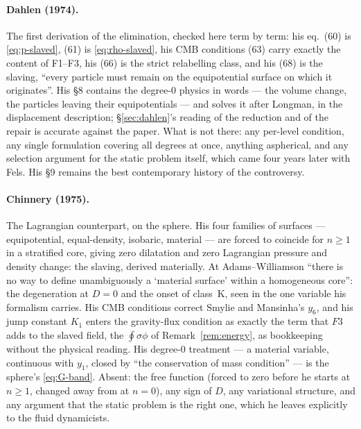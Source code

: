 \documentclass[11pt]{article}
\theoremstyle{definition}
\theoremstyle{remark}
\begin{document}
\paragraph{Dahlen (1974).} The first derivation of the elimination,
checked here term by term: his eq.~(60) is \eqref{eq:p-slaved}, (61)
is \eqref{eq:rho-slaved}, his CMB conditions (63) carry exactly the
content of F1--F3, his (66) is the strict relabelling class, and his
(68) is the slaving, ``every particle must remain on the equipotential
surface on which it originates''. His \S8 contains the degree-0
physics in words --- the volume change, the particles leaving their
equipotentials --- and solves it after Longman, in the displacement
description; \S\ref{sec:dahlen}'s reading of the reduction and of the
repair is accurate against the paper. What is not there: any per-level
condition, any single formulation covering all degrees at once,
anything aspherical, and any selection argument for the static problem
itself, which came four years later with Fels. His \S9 remains the
best contemporary history of the controversy.

\paragraph{Chinnery (1975).} The Lagrangian counterpart, on the
sphere. His four families of surfaces --- equipotential,
equal-density, isobaric, material --- are forced to coincide for $n
\ge 1$ in a stratified core, giving zero dilatation and zero
Lagrangian pressure and density change: the slaving, derived
materially. At Adams--Williamson ``there is no way to define
unambiguously a `material surface' within a homogeneous core'': the
degeneration at $D = 0$ and the onset of class~K, seen in the one
variable his formalism carries. His CMB conditions correct Smylie and
Mansinha's $y_6$, and his jump constant $K_1$ enters the gravity-flux
condition as exactly the term that $F3$ adds to the slaved field, the
$\oint\sigma\phi$ of Remark~\ref{rem:energy}, as bookkeeping without
the physical reading. His degree-0 treatment --- a
material variable, continuous with $y_1$, closed by ``the conservation
of mass condition'' --- is the sphere's \eqref{eq:G-band}. Absent: the
free function (forced to zero before he starts at $n \ge 1$, changed
away from at $n = 0$), any sign of $D$, any variational structure, and
any argument that the static problem is the right one, which he leaves
explicitly to the fluid dynamicists.
\end{document}

